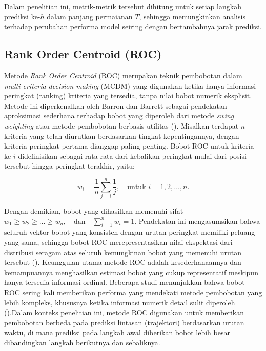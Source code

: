 Dalam penelitian ini, metrik-metrik tersebut dihitung untuk setiap langkah prediksi ke-$h$ dalam panjang permaianan $T$, sehingga memungkinkan analisis terhadap perubahan performa model seiring dengan bertambahnya jarak prediksi.


\subsection{Rank Order Centroid (ROC)}\label{sec:ROC}

Metode \textit{Rank Order Centroid} (ROC) merupakan teknik pembobotan dalam \textit{multi-criteria decision making} (MCDM) yang digunakan ketika hanya informasi peringkat (ranking) kriteria yang tersedia, tanpa nilai bobot numerik eksplisit. Metode ini diperkenalkan oleh Barron dan Barrett sebagai pendekatan aproksimasi sederhana terhadap bobot yang diperoleh dari metode \textit{swing weighting} atau metode pembobotan berbasis utilitas (\cite{barron1996decision}). Misalkan terdapat $n$ kriteria yang telah diurutkan berdasarkan tingkat kepentingannya, dengan kriteria peringkat pertama dianggap paling penting. Bobot ROC untuk kriteria ke-$i$ didefinisikan sebagai rata-rata dari kebalikan peringkat mulai dari posisi tersebut hingga peringkat terakhir, yaitu:

\begin{equation}
w_i = \frac{1}{n} \sum_{j=i}^{n} \frac{1}{j},
\quad \text{untuk } i = 1, 2, \dots, n.
\end{equation}

Dengan demikian, bobot yang dihasilkan memenuhi sifat $w_1 \ge w_2 \ge \dots \ge w_n,\quad \text{dan} \quad \sum_{i=1}^{n} w_i = 1$. Pendekatan ini mengasumsikan bahwa seluruh vektor bobot yang konsisten dengan urutan peringkat memiliki peluang yang sama, sehingga bobot ROC merepresentasikan nilai ekspektasi dari distribusi seragam atas seluruh kemungkinan bobot yang memenuhi urutan tersebut (\cite{barron1996decision}). Keunggulan utama metode ROC adalah kesederhanaannya dan kemampuannya menghasilkan estimasi bobot yang cukup representatif meskipun hanya tersedia informasi ordinal. Beberapa studi menunjukkan bahwa bobot ROC sering kali memberikan performa yang mendekati metode pembobotan yang lebih kompleks, khususnya ketika informasi numerik detail sulit diperoleh (\cite{stillwell1981preference}).Dalam konteks penelitian ini, metode ROC digunakan untuk memberikan pembobotan berbeda pada prediksi lintasan (trajektori) berdasarkan urutan waktu, di mana prediksi pada langkah awal diberikan bobot lebih besar dibandingkan langkah berikutnya dan sebaliknya.